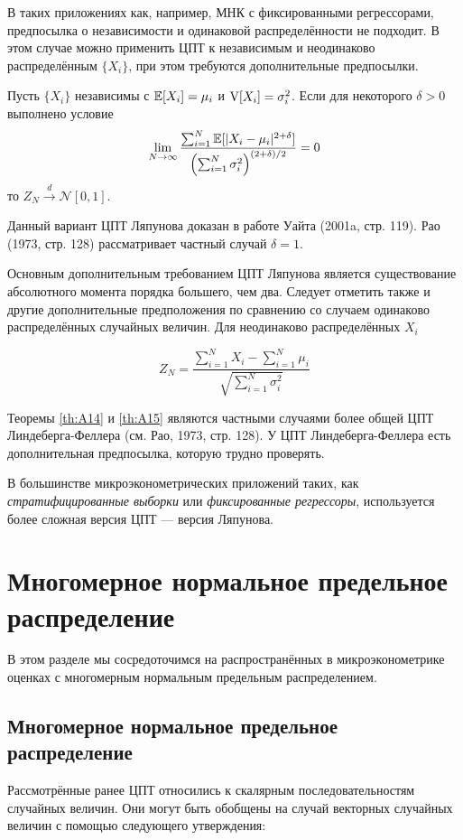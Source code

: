 В таких приложениях как, например, МНК с фиксированными регрессорами, предпосылка о независимости и одинаковой распределённости не подходит. В этом случае можно применить ЦПТ к независимым и неодинаково распределённым $\{X_i\}$, при этом требуются дополнительные предпосылки.

\begin{theorem}
\label{th:A15}
Пусть $\{X_i\}$ независимы с $\mathbb{E}[X_i]=\mu_i$ и $\mathrm{V}[X_i]=\sigma^2_i$. Если для некоторого $\delta>0$ выполнено условие 
\[
\lim_{N\to\infty} \frac{\sum_{i=1}^N \mathbb{E}[|X_i-\mu_i|^{2+\delta}]}{\left( \sum_{i=1}^N \sigma_i^2 \right)^{(2+\delta)/2}} = 0
\]
то $Z_N \overset{d}{\to} \mathcal{N}[0,1]$.
\end{theorem}

Данный вариант ЦПТ Ляпунова доказан в работе Уайта (2001a, стр. 119). Рао (1973, стр. 128) рассматривает частный случай $\delta=1$.

Основным дополнительным требованием ЦПТ Ляпунова является существование абсолютного момента порядка большего, чем два. Следует отметить также и другие дополнительные предположения по сравнению со случаем одинаково распределённых случайных величин. Для неодинаково распределённых $X_i$ 

\[
Z_N=\frac{\sum_{i=1}^N X_i - \sum_{i=1}^N \mu_i}{\sqrt{\sum_{i=1}^N \sigma^2_i}}
\]

Теоремы \ref{th:A14} и \ref{th:A15} являются частными случаями более общей ЦПТ Линдеберга-Феллера (см. Рао, 1973, стр. 128). У ЦПТ Линдеберга-Феллера есть дополнительная предпосылка, которую трудно проверять.

В большинстве микроэконометрических приложений таких, как \textit{стратифицированные выборки} или \textit{фиксированные регрессоры}, используется более сложная версия ЦПТ --- версия Ляпунова.

\section{Многомерное нормальное предельное распределение}

В этом разделе мы сосредоточимся на распространённых в микроэконометрике оценках с многомерным нормальным предельным распределением.

\subsection{Многомерное нормальное предельное распределение}

Рассмотрённые ранее ЦПТ относились к скалярным последовательностям случайных величин. Они могут быть обобщены на случай векторных случайных величин с помощью следующего утверждения:

